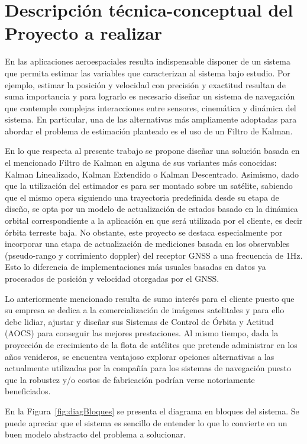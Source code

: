 \documentclass[11pt]{charter}
\begin{document}
\section{Descripción técnica-conceptual del Proyecto a realizar}
\label{sec:descripcion}

En las aplicaciones aeroespaciales resulta indispensable disponer de un sistema que permita estimar las variables que caracterizan al sistema bajo estudio. Por ejemplo, estimar la posición y velocidad con precisión y exactitud resultan de suma importancia y para lograrlo es necesario diseñar un sistema de navegación que contemple complejas interacciones entre sensores, cinemática y dinámica del sistema. En particular, una de las alternativas más ampliamente adoptadas para abordar el problema de estimación planteado es el uso de un Filtro de Kalman. 

En lo que respecta al presente trabajo se propone diseñar una solución basada en el mencionado Filtro de Kalman en alguna de sus variantes más conocidas: Kalman Linealizado, Kalman Extendido o Kalman Descentrado. Asimismo, dado que la utilización del estimador es para ser montado sobre un satélite, sabiendo que el mismo opera siguiendo una trayectoria predefinida desde su etapa de diseño, se opta por un modelo de actualización de estados basado en la dinámica orbital correspondiente a la aplicación en que será utilizada por el cliente, es decir órbita terreste baja. No obstante, este proyecto se destaca especialmente por incorporar una etapa de actualización de mediciones basada en los observables (pseudo-rango y corrimiento doppler) del receptor GNSS a una frecuencia de 1Hz. Esto lo diferencia de implementaciones más usuales basadas en datos ya procesados de posición y velocidad otorgadas por el GNSS.

Lo anteriormente mencionado resulta de sumo interés para el cliente puesto que su empresa se dedica a la comercialización de imágenes satelitales y para ello debe lidiar, ajustar y diseñar sus Sistemas de Control de Órbita y Actitud (AOCS) para conseguir las mejores prestaciones. Al mismo tiempo, dada la proyección de crecimiento de la flota de satélites que pretende administrar en los años venideros, se encuentra ventajoso explorar opciones alternativas a las actualmente utilizadas por la compañía para los sistemas de navegación puesto que la robustez y/o costos de fabricación podrían verse notoriamente beneficiados.

En la Figura~\ref{fig:diagBloques} se presenta el diagrama en bloques del sistema. Se puede apreciar que el sistema es sencillo de entender lo que lo convierte en un buen modelo abstracto del problema a solucionar.
\end{document}
